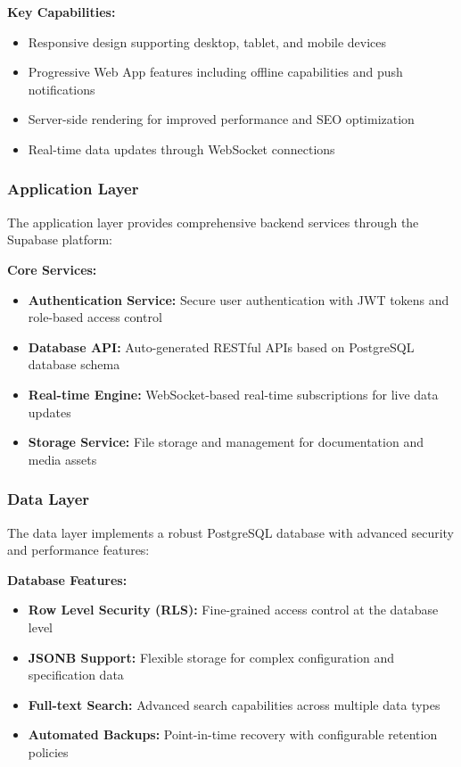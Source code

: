 \textbf{Key Capabilities:}
\begin{itemize}
\item Responsive design supporting desktop, tablet, and mobile devices
\item Progressive Web App features including offline capabilities and push notifications
\item Server-side rendering for improved performance and SEO optimization
\item Real-time data updates through WebSocket connections
\end{itemize}

\subsubsection{Application Layer}
The application layer provides comprehensive backend services through the Supabase platform:

\textbf{Core Services:}
\begin{itemize}
\item \textbf{Authentication Service:} Secure user authentication with JWT tokens and role-based access control
\item \textbf{Database API:} Auto-generated RESTful APIs based on PostgreSQL database schema
\item \textbf{Real-time Engine:} WebSocket-based real-time subscriptions for live data updates
\item \textbf{Storage Service:} File storage and management for documentation and media assets
\end{itemize}

\subsubsection{Data Layer}
The data layer implements a robust PostgreSQL database with advanced security and performance features:

\textbf{Database Features:}
\begin{itemize}
\item \textbf{Row Level Security (RLS):} Fine-grained access control at the database level
\item \textbf{JSONB Support:} Flexible storage for complex configuration and specification data
\item \textbf{Full-text Search:} Advanced search capabilities across multiple data types
\item \textbf{Automated Backups:} Point-in-time recovery with configurable retention policies
\end{itemize}

